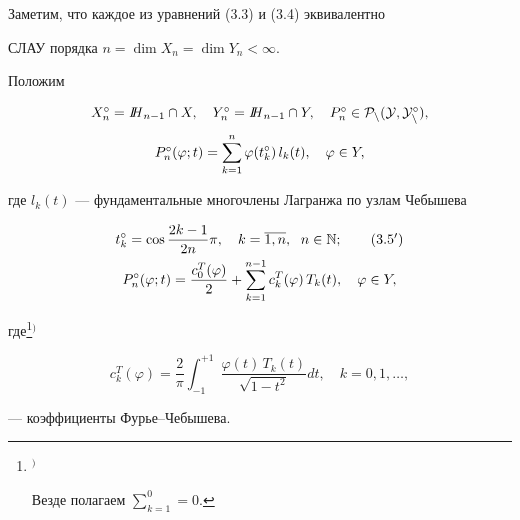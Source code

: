 Заметим, что каждое из уравнений (3.3) и (3.4) эквивалентно


СЛАУ порядка $n=\dim X_n=\dim Y_n<\infty $.





Положим


\begin{equation}


\begin{array}{c}


X_n^\circ =\bll{H}_{n-1}\cap X,\quad Y_n^\circ =\bll{H}_{n-1}\cap Y,\quad


P_n^\circ\in \cal P_n(Y,Y_n^\circ), \\[3mm]


%


P_n^\circ (\varphi ;t)=\displaystyle\sum\limits_{k=1}^n


\varphi(t_k^\circ )\, l_k(t),\quad


\varphi\in Y,


\end{array}


\end{equation}


где $l_k(t)$ --- фундаментальные многочлены Лагранжа по узлам Чебышева


\begin{gather}


t_k^\circ =\cos{\frac{2k-1}{2n}\pi},\quad k=\overline{1,n},\ \;


n\in \Bbb N;\tag{$3.5'$} \\


%


P_n^\circ (\varphi ;t)=\frac{c_0^T(\varphi )}{2}+\sum_{k=1}^{n-1}c_k^T


(\varphi)\, T_k(t),\quad \varphi\in Y,


\end{gather}


где\footnote{$^)$


Везде полагаем $\sum\limits_{k=1}^0=0$.}$^)$


\begin{equation}


c_k^T(\varphi )=\frac{2}{\pi}\int_{-1}^{+1}\;\frac{\varphi(t)\, T_k(t)}


{\sqrt{1-t^2}}dt,\quad k=0,1,\dotsc,


\tag{$3.6'$}


\end{equation}


--- коэффициенты Фурье--Чебышева.





